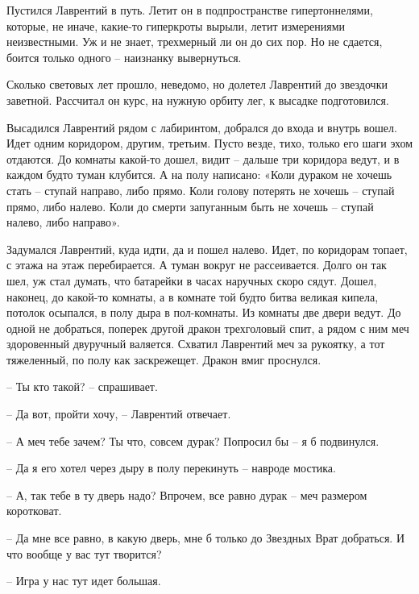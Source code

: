 \documentclass[ebook,oneside,final,openright]{memoir}
\begin{document}
\par
Пустился Лаврентий в путь. Летит он в подпространстве гипертоннелями, которые, не иначе, какие-то гиперкроты вырыли, летит измерениями неизвестными. Уж и не знает, трехмерный ли он до сих пор. Но не сдается, боится только одного – наизнанку вывернуться.\par
\par
Сколько световых лет прошло, неведомо, но долетел Лаврентий до звездочки заветной. Рассчитал он курс, на нужную орбиту лег, к высадке подготовился.\par
\par
Высадился Лаврентий рядом с лабиринтом, добрался до входа и внутрь вошел. Идет одним коридором, другим, третьим. Пусто везде, тихо, только его шаги эхом отдаются. До комнаты какой-то дошел, видит – дальше три коридора ведут, и в каждом будто туман клубится. А на полу написано: «Коли дураком не хочешь стать – ступай направо, либо прямо. Коли голову потерять не хочешь – ступай прямо, либо налево. Коли до смерти запуганным быть не хочешь – ступай налево, либо направо».\par
\par
Задумался Лаврентий, куда идти, да и пошел налево. Идет, по коридорам топает, с этажа на этаж перебирается. А туман вокруг не рассеивается. Долго он так шел, уж стал думать, что батарейки в часах наручных скоро сядут. Дошел, наконец, до какой-то комнаты, а в комнате той будто битва великая кипела, потолок осыпался, в полу дыра в пол-комнаты. Из комнаты две двери ведут. До одной не добраться, поперек другой дракон трехголовый спит, а рядом с ним меч здоровенный двуручный валяется. Схватил Лаврентий меч за рукоятку, а тот тяжеленный, по полу как заскрежещет. Дракон вмиг проснулся.\par
\par
– Ты кто такой? – спрашивает.\par
– Да вот, пройти хочу, – Лаврентий отвечает.\par
– А меч тебе зачем? Ты что, совсем дурак? Попросил бы – я б подвинулся.\par
– Да я его хотел через дыру в полу перекинуть – навроде мостика.\par
– А, так тебе в ту дверь надо? Впрочем, все равно дурак – меч размером коротковат.\par
– Да мне все равно, в какую дверь, мне б только до Звездных Врат добраться. И что вообще у вас тут творится?\par
– Игра у нас тут идет большая.\par
\end{document}
